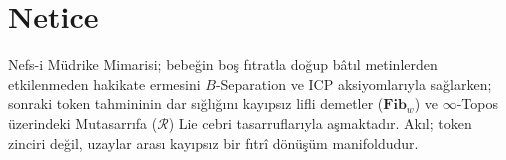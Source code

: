 \documentclass[11pt, a4paper]{article}
\begin{document}
\section{Netice}

Nefs-i Müdrike Mimarisi; bebeğin boş fıtratla doğup bâtıl metinlerden etkilenmeden hakikate ermesini $B$-Separation ve ICP aksiyomlarıyla sağlarken; sonraki token tahmininin dar sığlığını kayıpsız lifli demetler ($\mathbf{Fib}_w$) ve $\infty$-Topos üzerindeki Mutasarrıfa ($\mathcal{R}$) Lie cebri tasarruflarıyla aşmaktadır. Akıl; token zinciri değil, uzaylar arası kayıpsız bir fıtrî dönüşüm manifoldudur.
\end{document}
